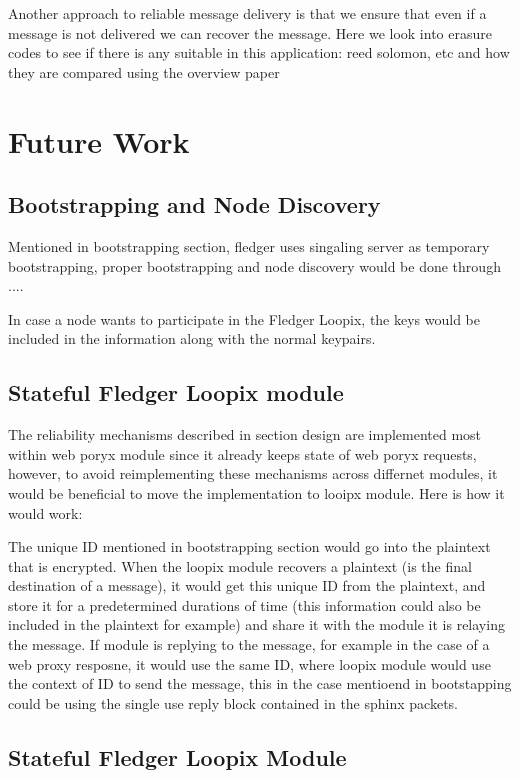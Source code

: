 \documentclass[a4paper,11pt,oneside]{report}
\begin{document}
Another approach to reliable message delivery is that we ensure that even if a message is not delivered we can recover the message. Here we look into erasure codes to see if there is any suitable in this application:
reed solomon, etc and how they are compared using the overview paper


\chapter{Future Work}
\label{sec:future_work}
\section{Bootstrapping and Node Discovery}
Mentioned in bootstrapping section, fledger uses singaling server as temporary bootstrapping, proper bootstrapping and node discovery would be done through ....

In case a node wants to participate in the Fledger Loopix, the keys would be included in the information along with the normal keypairs. 

\section{Stateful Fledger Loopix module}
The reliability mechanisms described in section design are implemented most within web poryx module since it already keeps state of web poryx requests, however, to avoid reimplementing these mechanisms across differnet modules, it would be beneficial to move the implementation to looipx module. Here is how it would work:

The unique ID mentioned in bootstrapping section would go into the plaintext that is encrypted. When the loopix module recovers a plaintext (is the final destination of a message), it would get this unique ID from the plaintext, and store it for a predetermined durations of time (this information could also be included in the plaintext for example) and share it with the module it is relaying the message. If module is replying to the message, for example in the case of a web proxy resposne, it would use the same ID, where loopix module would use the context of ID to send the message, this in the case mentioend in bootstapping could be using the single use reply block contained in the sphinx packets.

\section{Stateful Fledger Loopix Module}
\end{document}
